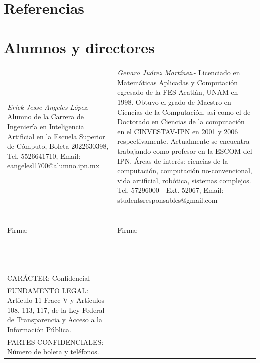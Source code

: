 \documentclass[letterpaper,10pt,oneside]{article}
\begin{document}
	\section{Referencias} %
	\renewcommand{\refname}{} %
	
	
	
	\section{Alumnos y directores}
	
\begin{tabular}{@{} p{} p{} @{}}
	\textit{Erick Jesse Angeles López}.- Alumno de la Carrera de Ingeniería en Inteligencia Artificial en la Escuela Superior de Cómputo, Boleta 2022630398, Tel. 5526641710, Email: eangelesl1700@alumno.ipn.mx
	&
	\textit{Genaro Juárez Martínez}.- Licenciado en Matemáticas Aplicadas y Computación egresado de la FES Acatlán, UNAM en 1998. Obtuvo el grado de Maestro en Ciencias de la Computación, asi como el de Doctorado en Ciencias de la computación en el CINVESTAV-IPN en 2001 y 2006 respectivamente. Actualmente se encuentra trabajando como profesor en la ESCOM del IPN. Áreas de interés: ciencias de la computación, computación no-convencional, vida artificial, robótica, sistemas complejos. Tel. 57296000 - Ext. 52067, Email: studentsresponsables@gmail.com
	
	 \\ & \\ & \\
	 & \\ & \\
	
	Firma:
	\rule{6cm}{0.4pt} & 
	
	Firma:
	\rule{6cm}{0.4pt} \\
	
	& \\ & \\
	& \\ & \\
	& \\ & \\
	& \\ & \\
	
	
	\cellcolor{gray!30} CARÁCTER: Confidencial & \\
	\cellcolor{gray!30} FUNDAMENTO LEGAL: Articulo 11 Fracc V y Artículos 108, 113, 117, de la Ley Federal de Transparencia y Acceso a la Información Pública. &\\
	\cellcolor{gray!30} PARTES CONFIDENCIALES: Número de boleta y teléfonos. & \\


\end{tabular}
\end{document}
